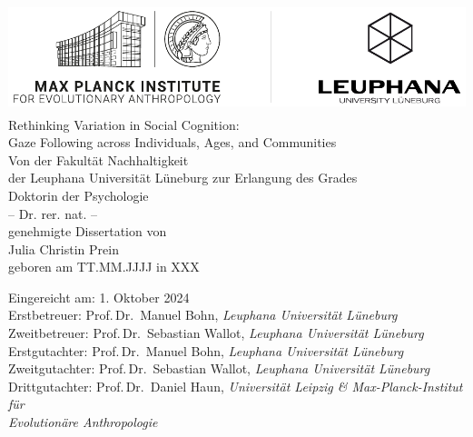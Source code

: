 \documentclass[
]{scrbook}
\author{}
\date{\vspace{-2.5em}}
\begin{document}
\frontmatter

\begin{titlepage}                   
    \begin{center}
        \includegraphics[height=3.2cm]{logo.pdf}\\[40mm]
        
        \huge {\linespread{1.5} Rethinking Variation in Social Cognition: \\ Gaze Following across Individuals, Ages, and Communities}\\[30mm]
        
                
        \normalsize Von der Fakultät Nachhaltigkeit \\ der Leuphana Universität Lüneburg zur Erlangung des Grades\\
        Doktorin der Psychologie\\-- Dr. rer. nat. --\\[10mm]
        
        genehmigte Dissertation von\\[10mm]
        Julia Christin Prein\\
        geboren am TT.MM.JJJJ in XXX
        
    \vspace*{\fill} 
    \end{center}
    
    \newpage
    \thispagestyle{empty}
    \begin{flushleft}
      \begin{normalsize}
      
      \vspace*{\fill} 
            Eingereicht am: \tabto*{30mm} 1. Oktober 2024 \\[10mm]
            
            Erstbetreuer: \tabto*{30mm} Prof.\,Dr.\, Manuel Bohn, \textit{Leuphana Universität Lüneburg}\\
                Zweitbetreuer: \tabto*{30mm} Prof.\,Dr.\, Sebastian Wallot, \textit{Leuphana Universität Lüneburg}\\[10mm]
                
                Erstgutachter: \tabto*{30mm} Prof.\,Dr.\, Manuel Bohn, \textit{Leuphana Universität Lüneburg}\\
                Zweitgutachter: \tabto*{30mm} Prof.\,Dr.\, Sebastian Wallot, \textit{Leuphana Universität Lüneburg}\\
                Drittgutachter: \tabto*{30mm} Prof.\,Dr.\, Daniel Haun, \textit{Universität Leipzig \& Max-Planck-Institut für\\
                \tabto*{30mm} Evolutionäre Anthropologie}\\[10mm]
        \end{normalsize}
    \end{flushleft}
    

\end{titlepage}
\end{document}
